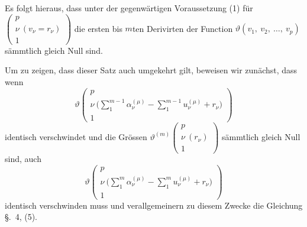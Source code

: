 \documentclass[12pt,a4paper]{article}
\begin{document}
Es folgt hieraus, dass unter der gegenwärtigen Voraussetzung (1) für $\left(\begin{array}{c} p\\ \nu\ (v_\nu = r_\nu)\\ 1 \end{array}\right)$ die ersten bis $m$ten Derivirten der Function $\vartheta(v_1,\ v_2,\ \ldots,\ v_p)$ sämmtlich gleich Null sind.

Um zu zeigen, dass dieser Satz auch umgekehrt gilt, beweisen wir zunächst, dass wenn
\[ \vartheta\left(\begin{array}{c} p\\ \nu\ \bigl(\sum\limits_1^{m-1} \alpha_\nu^{(\mu)} - \sum\limits_1^{m-1} u_\nu^{(\mu)} + r_\nu\bigr)\\ 1 \end{array}\right) \]
identisch verschwindet und die Grössen $\vartheta^{(m)}\left(\begin{array}{c} p\\ \nu\ (r_\nu)\\ 1 \end{array}\right)$ sämmtlich gleich Null sind, auch
\[ \vartheta\left(\begin{array}{c} p\\ \nu\ \bigl(\sum\limits_1^m \alpha_\nu^{(\mu)} - \sum\limits_1^m u_\nu^{(\mu)} + r_\nu\bigr)\\ 1 \end{array}\right) \]
identisch verschwinden muss und verallgemeinern zu diesem Zwecke die Gleichung \S.~4, (5).

\newpage
\end{document}
